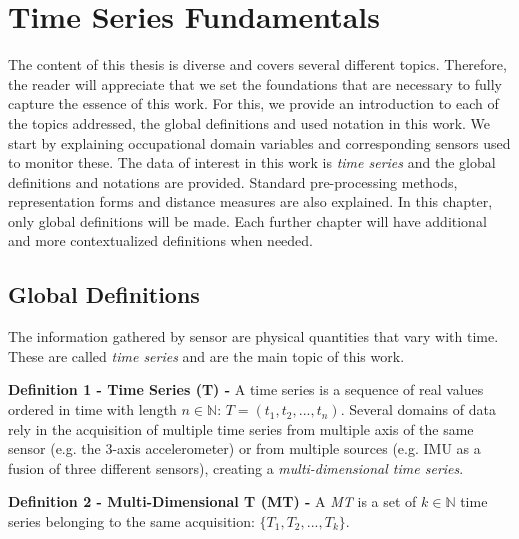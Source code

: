
%

\chapter{Time Series Fundamentals}
\label{cha:theory}

The content of this thesis is diverse and covers several different topics. Therefore, the reader will appreciate that we set the foundations that are necessary to fully capture the essence of this work. For this, we provide an introduction to each of the topics addressed, the global definitions and used notation in this work. We start by explaining occupational domain variables and corresponding sensors used to monitor these. The data of interest in this work is \textit{time series} and the global definitions and notations are provided. Standard pre-processing methods, representation forms and distance measures are also explained. In this chapter, only global definitions will be made. Each further chapter will have additional and more contextualized definitions when needed.

\section{Global Definitions}
\label{sec:global}

The information gathered by sensor are physical quantities that vary with time. These are called \textit{time series} and are the main topic of this work.


    \item \textbf{Definition 1 - Time Series (T) - } A time series is a sequence of real values ordered in time with length $n \in \mathbb{N}$: $T = (t_1, t_2, ..., t_n)$.
    Several domains of data rely in the acquisition of multiple time series from multiple axis of the same sensor (e.g. the 3-axis accelerometer) or from multiple sources (e.g. IMU as a fusion of three different sensors), creating a \textit{multi-dimensional time series}.
    
    \item \textbf{Definition 2 - Multi-Dimensional T (MT) - } A \textit{MT} is a set of $k \in \mathbb{N}$ time series belonging to the same acquisition: $\{T_1, T_2, ..., T_k\}$.

